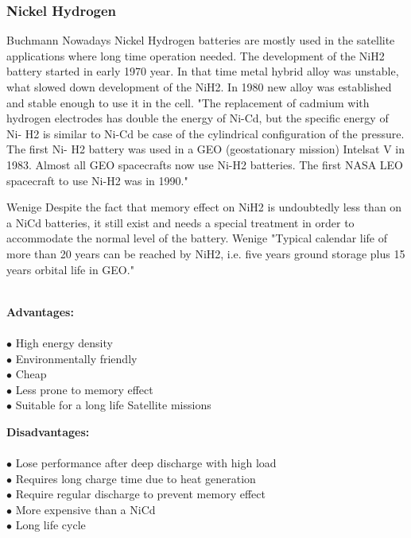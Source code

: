 \subsubsection{Nickel Hydrogen \label{sec:tech}}
Buchmann\cite{7} Nowadays Nickel Hydrogen batteries are mostly used in the satellite applications where long time operation needed. The development of the NiH2 battery started in early 1970 year. In that time metal hybrid alloy was unstable, what slowed down development of the NiH2. In 1980 new alloy was established and stable enough to use it in the cell. 
\cite{10}"The replacement of cadmium with hydrogen electrodes has double the energy of Ni-Cd, but the specific energy of Ni- H2 is similar to Ni-Cd be case of the cylindrical configuration of the pressure. The first Ni- H2 battery was used in a GEO (geostationary mission) Intelsat V in 1983.  Almost all GEO spacecrafts now use Ni-H2 batteries. The first NASA LEO spacecraft to use Ni-H2 was in 1990."


Wenige\cite{8} Despite the fact that memory effect on NiH2 is undoubtedly less than on a NiCd batteries, it still exist and needs a special treatment in order to accommodate the normal level of the battery. Wenige\cite{8} "Typical calendar life of more than 20 years can be reached by NiH2, i.e. five years ground storage plus 15  years  orbital  life  in  GEO." \\ \\


\begin{multicols}{2}
	
	\textbf{Advantages:} \\ \\
	$\bullet$ High energy density\\
	$\bullet$ Environmentally friendly\\
	$\bullet$ Cheap\\
	$\bullet$ Less prone to memory effect\\
	$\bullet$ Suitable for a long life Satellite missions\\
	

	
	
	\columnbreak
	
	\textbf{Disadvantages:} \\ \\
	$\bullet$ Lose performance after deep discharge with high load\\
	$\bullet$ Requires long charge time due to heat generation\\
	$\bullet$ Require regular discharge to prevent memory effect\\ 
	$\bullet$ More expensive than a NiCd\\
	$\bullet$ Long life cycle

	
\end{multicols}

